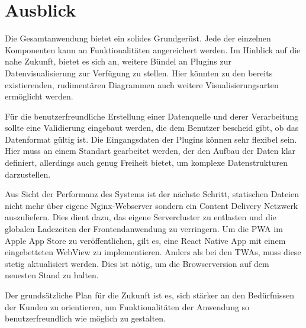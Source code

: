 \chapter{Ausblick}
\label{chap:ausblick}

Die Gesamtanwendung bietet ein solides Grundgerüst. Jede der einzelnen Komponenten
kann an Funktionalitäten angereichert werden. Im Hinblick auf die nahe Zukunft, bietet es sich an,
weitere Bündel an Plugins zur Datenvisualisierung zur Verfügung zu stellen. Hier könnten
zu den bereits existierenden, rudimentären Diagrammen auch weitere Visualisierungsarten ermöglicht
werden.

Für die benutzerfreundliche Erstellung einer Datenquelle und derer Verarbeitung
sollte eine Validierung eingebaut werden, die dem Benutzer bescheid gibt, ob das Datenformat
gültig ist. Die Eingangsdaten der Plugins können sehr flexibel sein. Hier muss an einem Standart
gearbeitet werden, der den Aufbau der Daten klar definiert, allerdings auch genug Freiheit bietet,
um komplexe Datenstrukturen darzustellen.

Aus Sicht der Performanz des Systems ist der nächste
Schritt, statischen Dateien nicht mehr über eigene Nginx-Webserver sondern ein
Content Delivery Netzwerk auszuliefern. Dies dient dazu, das eigene Servercluster
zu entlasten und die globalen Ladezeiten der Frontendanwendung zu verringern.
Um die PWA im Apple App Store zu veröffentlichen, gilt es, eine React Native
App mit einem eingebetteten WebView zu implementieren. Anders als bei den TWAs, muss
diese stetig aktualisiert werden. Dies ist nötig, um die Browserversion auf
dem neuesten Stand zu halten.

Der grundsätzliche Plan für die Zukunft ist es, sich stärker an den
Bedürfnissen der Kunden zu orientieren, um Funktionalitäten der Anwendung
so benutzerfreundlich wie möglich zu gestalten.

